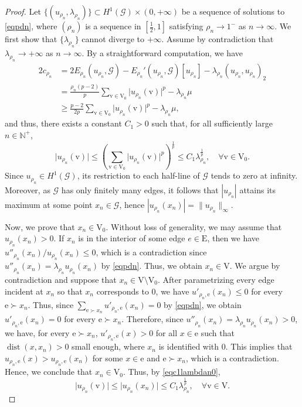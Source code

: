 \documentclass[11pt]{amsart}
\newcommand{\abs}[1]{\lvert#1\rvert}
\newcommand{\norm}[1]{\lVert#1\rVert}
\newcommand{\G}{\mathcal{G}}
\newcommand{\E}{\mathrm{E}}
\newcommand{\V}{\mathrm{V}}
\newcommand{\e}{\mathrm{e}}
\newcommand{\vv}{\mathrm{v}}
\numberwithin{equation}{section}
\begin{document}
\begin{proof}
Let $\{(u_{\rho_n},\lambda_{\rho_n})\} \subset H^1(\G)\times (0,+\infty)$ be a sequence of solutions to \eqref{eqpdn}, where $ (\rho_n)$ is a sequence in $[\frac{1}{2},1]$ satisfying $\rho_n \to 1^{-}$ as $n \to \infty$. We first show that  $\{\lambda_{\rho_n}\}$ cannot diverge to $+\infty$. Assume by contradiction that $\lambda_{\rho_n} \to +\infty$ as $n \to \infty$. By a straightforward computation, we have
$$
\begin{aligned}
    2c_{\rho_n}&=2E_{\rho_n}(u_{\rho_n},\G)-E_{\rho_n}'(u_{\rho_n} ,\G)[u_{\rho_n}]-\lambda_{\rho_n}(u_{\rho_n},u_{\rho_n})_2\\
    &=\frac{\rho_n(p-2)}{p}\sum_{\vv \in \V_0}\abs{u_{\rho_n}(\vv)}^p-\lambda_{\rho_n}\mu\\
    &\geq \frac{p-2}{2p}\sum_{\vv \in \V_0}\abs{u_{\rho_n}(\vv)}^p-\lambda_{\rho_n}\mu,
\end{aligned}
$$
and thus, there exists a constant $C_1>0$  such that, for all sufficiently large $n\in\mathbb{N}^+$, 
\begin{equation}\label{eqc1lambdan0}
    \abs{u_{\rho_n}(\vv)} \leq \left(\sum_{\vv \in \V_0}\abs{u_{\rho_n}(\vv)}^p\right)^\frac{1}{p} \leq C_1\lambda_{\rho_n}^\frac{1}{p}, \quad \forall \vv \in \V_0.
\end{equation}
Since \(u_{\rho_n}\in H^1(\G)\), its restriction to each half-line of \(\G\)  tends to zero at infinity. Moreover, as \(\G\) has only finitely many edges, it follows that \(|u_{\rho_n}|\) attains its maximum at some point \(x_n\in\G\), hence
$|u_{\rho_n}(x_n)|=\norm{u_{\rho_n}}_\infty$.

Now, we prove that $x_n \in \V_0$. Without loss of generality, we may assume that $u_{\rho_n}(x_n)>0$.  If $x_n$ is in the interior of some edge $e \in \E$, then we have $u''_{\rho_n}(x_n)/u_{\rho_n}(x_n) \leq 0$, which is a contradiction since $u''_{\rho_n}(x_n) = \lambda_{\rho_n}u_{\rho_n}(x_n)$ by \eqref{eqpdn}. Thus, we obtain $x_n \in \V$. We argue by contradiction and suppose that $x_n \in \V \setminus \V_0$. After parametrizing every edge incident at $x_n$ so that $x_n$ corresponds to $0$, we have $u'_{\rho_n,\e}(x_n)\leq0$ for every $\e\succ x_n$. Thus, since $\displaystyle\sum_{\e \succ x_n} u'_{\rho_n,\e}(x_n)=0$ by \eqref{eqpdn}, we obtain $u'_{\rho_n,\e}(x_n)=0$ for every $\e \succ x_n$. Therefore, since $u''_{\rho_n}(x_n)=\lambda_{\rho_n}u_{\rho_n}(x_n)>0$, we have, for every $\e \succ x_n$, $u'_{\rho_n,\e}(x)>0$ for all $x \in \e$ such that $\operatorname{dist}(x,x_n)>0$ small enough, where $x_n$ is identified with $0$. This implies that $u_{\rho_n,\e}(x) > u_{\rho_n,\e}(x_n)$ for some $x \in \e$ and $\e \succ x_n$, which is a contradiction. Hence, we conclude that  $x_n \in \V_0$. Thus, by \eqref{eqc1lambdan0},
     \begin{equation}\label{eqc1lambdan}
                 \abs{u_{\rho_n}(\vv)} \leq \abs{u_{\rho_n}(x_n)} \leq C_1\lambda_{\rho_n}^\frac{1}{p}, \quad \forall \vv \in \V.
     \end{equation}
    

\end{proof}
\end{document}
